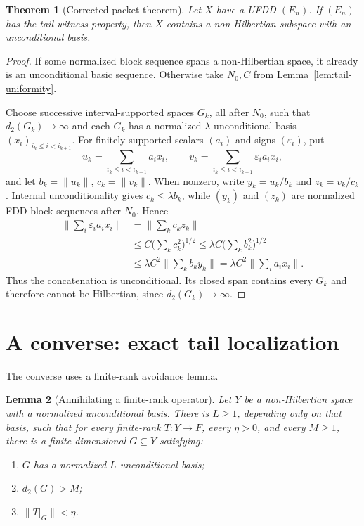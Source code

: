 \documentclass[11pt]{article}
\newtheorem{theorem}{Theorem}[section]
\newtheorem{lemma}[theorem]{Lemma}
\theoremstyle{definition}
\newcommand{\dd}{d_2}
\begin{document}
\begin{theorem}[Corrected packet theorem]\label{thm:sufficient}
Let $X$ have a UFDD $(E_n)$.  If $(E_n)$ has the tail-witness property, then
$X$ contains a non-Hilbertian subspace with an unconditional basis.
\end{theorem}

\begin{proof}
If some normalized block sequence spans a non-Hilbertian space, it already is
an unconditional basic sequence.  Otherwise take $N_0,C$ from
Lemma~\ref{lem:tail-uniformity}.

Choose successive interval-supported spaces $G_k$, all after $N_0$, such that
$\dd(G_k)\to\infty$ and each $G_k$ has a normalized
$\lambda$-unconditional basis $(x_i)_{i_k\leq i<i_{k+1}}$.  For finitely
supported scalars $(a_i)$ and signs $(\varepsilon_i)$, put
\[
 u_k=\sum_{i_k\leq i<i_{k+1}}a_i x_i,
 \qquad
 v_k=\sum_{i_k\leq i<i_{k+1}}\varepsilon_i a_i x_i,
\]
and let $b_k=\|u_k\|$, $c_k=\|v_k\|$.  When nonzero, write
$y_k=u_k/b_k$ and $z_k=v_k/c_k$.  Internal unconditionality gives
$c_k\leq\lambda b_k$, while $(y_k)$ and $(z_k)$ are normalized FDD block
sequences after $N_0$.  Hence
\begin{align*}
 \Big\|\sum_i\varepsilon_i a_i x_i\Big\|
 &=\Big\|\sum_k c_k z_k\Big\| \\
 &\leq C\Big(\sum_k c_k^2\Big)^{1/2}
 \leq \lambda C\Big(\sum_k b_k^2\Big)^{1/2} \\
 &\leq \lambda C^2\Big\|\sum_k b_k y_k\Big\|
 =\lambda C^2\Big\|\sum_i a_i x_i\Big\|.
\end{align*}
Thus the concatenation is unconditional.  Its closed span contains every
$G_k$ and therefore cannot be Hilbertian, since $\dd(G_k)\to\infty$.
\end{proof}

\section{A converse: exact tail localization}

The converse uses a finite-rank avoidance lemma.

\begin{lemma}[Annihilating a finite-rank operator]\label{lem:finite-rank}
Let $Y$ be a non-Hilbertian space with a normalized unconditional basis.
There is $L\geq1$, depending only on that basis, such that for every
finite-rank $T:Y\to F$, every $\eta>0$, and every $M\geq1$, there is a
finite-dimensional $G\subseteq Y$ satisfying:
\begin{enumerate}[label=(\roman*)]
\item $G$ has a normalized $L$-unconditional basis;
\item $\dd(G)>M$;
\item $\|T|_G\|<\eta$.
\end{enumerate}
\end{lemma}
\end{document}
